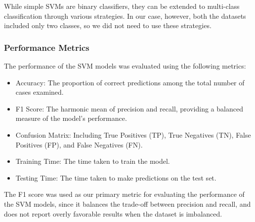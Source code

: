 While simple SVMs are binary classifiers, they can be extended to multi-class classification through various strategies.
In our case, however, both the datasets included only two classes, so we did not need to use these strategies.

\subsubsection{Performance Metrics}

The performance of the SVM models was evaluated using the following metrics:

\begin{itemize}
    \item Accuracy: The proportion of correct predictions among the total number of cases examined.
    \item F1 Score: The harmonic mean of precision and recall, providing a balanced measure of the model's performance.
    \item Confusion Matrix: Including True Positives (TP), True Negatives (TN), False Positives (FP), and False Negatives (FN).
    \item Training Time: The time taken to train the model.
    \item Testing Time: The time taken to make predictions on the test set.
\end{itemize}

The F1 score was used as our primary metric for evaluating the performance of the SVM models,
since it balances the trade-off between precision and recall, and does not report overly favorable results when the dataset is imbalanced.

